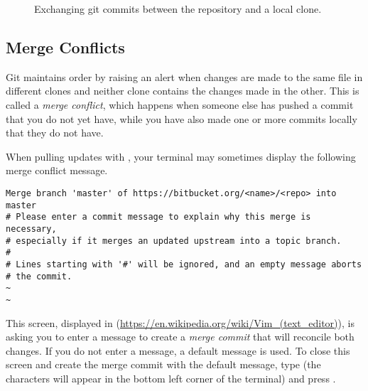 \begin{figure}[H]
\centering
{}
\caption{Exchanging git commits between the repository and a local clone.}
\end{figure}

\subsection*{Merge Conflicts} %
Git maintains order by raising an alert when changes are made to the same file in different clones and neither clone contains the changes made in the other.
This is called a \emph{merge conflict}, which happens when someone else  has pushed a commit that you do not yet have, while you have also made one or more commits locally that they do not have.

\begin{warn}
When pulling updates with , your terminal may sometimes display the following merge conflict message.
\begin{lstlisting}
Merge branch 'master' of https://bitbucket.org/<name>/<repo> into master
# Please enter a commit message to explain why this merge is necessary,
# especially if it merges an updated upstream into a topic branch.
#
# Lines starting with '#' will be ignored, and an empty message aborts
# the commit.
~
~
\end{lstlisting}

This screen, displayed in  (\url{https://en.wikipedia.org/wiki/Vim_(text_editor)}), is asking you to enter a message to create a \emph{merge commit} that will reconcile both changes.
If you do not enter a message, a default message is used.
To close this screen and create the merge commit with the default message, type  (the characters will appear in the bottom left corner of the terminal) and press .

\end{warn}

